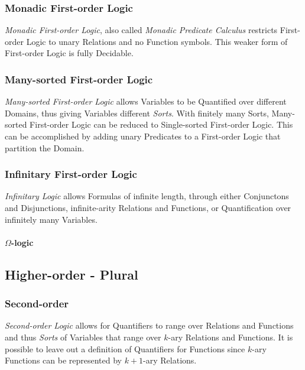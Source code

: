 \documentclass{article}
\begin{document}
\subsubsection{Monadic First-order Logic}

\emph{Monadic First-order Logic}, also called \emph{Monadic Predicate
  Calculus} restricts First-order Logic to unary Relations and no
Function symbols. This weaker form of First-order Logic is fully
Decidable.

\subsubsection{Many-sorted First-order Logic}\label{subsec:manysorted_logic}

\emph{Many-sorted First-order Logic} allows Variables to be Quantified
over different Domains, thus giving Variables different
\emph{Sorts}. With finitely many Sorts, Many-sorted First-order Logic
can be reduced to Single-sorted First-order Logic. This can be
accomplished by adding unary Predicates to a First-order Logic that
partition the Domain.

\subsubsection{Infinitary First-order Logic}

\emph{Infinitary Logic} allows Formulas of infinite length, through
either Conjunctons and Disjunctions, infinite-arity Relations and
Functions, or Quantification over infinitely many Variables.

\paragraph{$\Omega$-logic}\label{subsec:omega_logic}

\subsection{Higher-order - Plural}\label{subsec:higher_order}

\subsubsection{Second-order}

\emph{Second-order Logic} allows for Quantifiers to range over
Relations and Functions and thus \emph{Sorts} of Variables that range
over $k$-ary Relations and Functions. It is possible to leave out a
definition of Quantifiers for Functions since $k$-ary Functions can be
represented by $k+1$-ary Relations.\cite{shapiro00}
\end{document}
